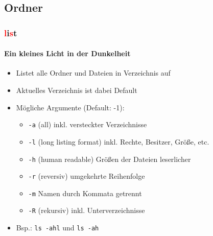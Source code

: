 \documentclass[12pt,utf8]{beamer}
\begin{document}
\subsection{Ordner}
\begin{frame}
\frametitle{\textcolor{red}{l}i\textcolor{red}{s}t}
\framesubtitle{\textcolor{ownDarkOr}{Ein kleines Licht in der Dunkelheit}}
\begin{itemize}
	\item Listet alle Ordner und Dateien in Verzeichnis auf
	\item Aktuelles Verzeichnis ist dabei Default
	\item Mögliche Argumente (Default: -1):
	\begin{itemize}[<+->]
		\item \texttt{-a}  (all) inkl. versteckter Verzeichnisse
		\item \texttt{-l}  (long listing format) inkl. Rechte, Besitzer, Größe, etc.
		\item \texttt{-h}  (human readable) Größen der Dateien leserlicher
		\item \texttt{-r}  (reversiv) umgekehrte Reihenfolge
		\item \texttt{-m}  Namen durch Kommata getrennt
		\item \texttt{-R}  (rekursiv) inkl. Unterverzeichnisse
	\end{itemize}
	\item Bsp.: \texttt{ls -ahl} und \texttt{ls -ah}
\end{itemize}
\end{frame}
\end{document}
